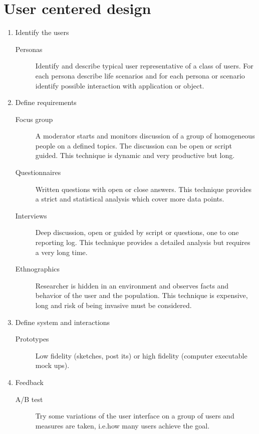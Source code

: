 \section{User centered design}
\begin{enumerate}
\item Identify the users
\begin{description}
\item [Personas] Identify and describe typical user representative of a class of users. For each persona describe life scenarios and for each persona or scenario identify possible interaction with application or object.
\end{description}

\item Define requirements
\begin{description}
\item [Focus group] A moderator starts and monitors discussion of a group of homogeneous people on a defined topics. The discussion can be open or script guided. This technique is dynamic and very productive but long.
\item [Questionnaires] Written questions with open or close answers. This technique provides a strict and statistical analysis which cover more data points.
\item [Interviews] Deep discussion, open or guided by script or questions, one to one reporting log. This technique provides a detailed analysis but requires a very long time.
\item [Ethnographics] Researcher is hidden in an environment and observes facts and behavior of the user and the population. This technique is expensive, long and risk of being invasive must be considered.
\end{description}

\item Define system and interactions
\begin{description}
\item [Prototypes] Low fidelity (sketches, post its) or high fidelity (computer executable mock ups). 
\end{description}

\item Feedback
\begin{description}
\item [A/B test] Try some variations of the user interface on a group of users and measures are taken, i.e.\@ how many users achieve the goal. 
\end{description}
\end{enumerate}